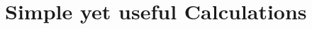 \documentclass[11pt, a4paper, BCOR=10mm, DIV=11]{scrbook}
\theoremstyle{definition}
\theoremstyle{plain}
\begin{document}
%  
%
%
%
%
%

%

\chapter{Simple yet useful Calculations} 



\printnomenclature

{}

\end{document}
